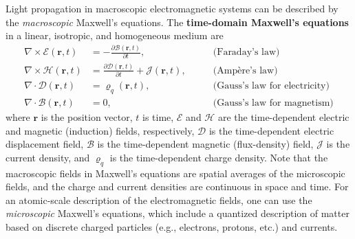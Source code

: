 Light propagation in macroscopic electromagnetic systems can be
described by the \emph{macroscopic} Maxwell's equations. The \textbf{time-domain Maxwell's
equations} in a linear, isotropic, and homogeneous medium are~\cite{maxwell1873,novotny}
\begin{align}
    \nabla \times \bm{\mathcal{E}} (\mathbf{r},t)            & = - \frac{\partial
    \bm{\mathcal{B}}(\mathbf{r},t)}{\partial t}, \quad \quad & \text{(Faraday's
    law)} \label{eq:faraday}                                                                                         \\
    \nabla \times \bm{\mathcal{H}} (\mathbf{r},t)            & = \frac{\partial
        \bm{\mathcal{D}}(\mathbf{r},t)}{\partial t} + \bm{\mathcal{J}}(\mathbf{r},t),
    \quad \quad                                              & \text{(Ampère's law)} \label{eq:ampere}               \\
    \nabla \cdot \bm{\mathcal{D}} (\mathbf{r},t)             & =
    \varrho_q(\mathbf{r},t), \quad \quad                & \text{(Gauss's law for electricity)}
    \label{eq:gauss_E}                                                                                               \\
    \nabla \cdot \bm{\mathcal{B}} (\mathbf{r},t)             & = 0, \quad \quad
                                                             & \text{(Gauss's law for magnetism)} \label{eq:Gauss_B}
\end{align}
where $\mathbf{r}$ is the position vector, $t$ is time, $\bm{\mathcal{E}}$ and $\bm{\mathcal{H}}$ are the time-dependent electric
and magnetic (induction) fields, respectively,
$\bm{\mathcal{D}}$ is the time-dependent electric displacement field,
$\bm{\mathcal{B}}$ is the time-dependent magnetic (flux-density) field,
$\bm{\mathcal{J}}$ is the current density,
and $\varrho_q$ is the time-dependent charge density. %
Note that the macroscopic fields in Maxwell's equations
are spatial averages of the
microscopic fields, and the charge and current densities are continuous in space
and time.
For an atomic-scale description of the electromagnetic fields, one can use the
\emph{microscopic}
Maxwell's equations, which include a quantized description of matter based on
discrete charged particles
(e.g., electrons, protons, etc.) and currents.

